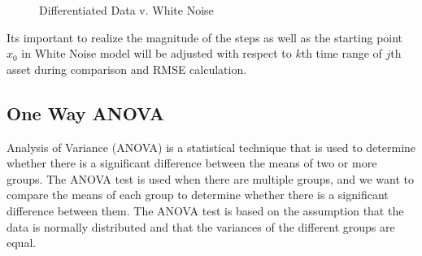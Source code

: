 \documentclass{article}[12pt]
\begin{document}
        \begin{figure}[htbp]
            \centering
            \hfill
            \caption{Differentiated Data v. White Noise}
          \end{figure}

          Its important to realize the magnitude of the steps as well as the starting point $x_0$ in White Noise model will be adjusted with respect to $k$th time range of $j$th asset during comparison and RMSE calculation.

        \subsection{One Way ANOVA}
        Analysis of Variance (ANOVA) is a statistical technique that is used to determine whether there is a significant difference between the means of two or more groups. The ANOVA test is used when there are multiple groups, and we want to compare the means of each group to determine whether there is a significant difference between them. The ANOVA test is based on the assumption that the data is normally distributed and that the variances of the different groups are equal.
\end{document}
